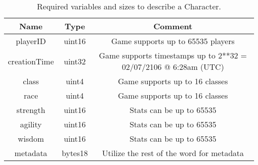 \begin{table}[H]
	\centering
	\vspace*{-1ex}
	\scriptsize
	\vspace{-1ex}
	\caption{Required variables and sizes to describe a Character.}
	\begin{tabular}{|c|c|c|}
        \hline
        \textbf{Name} & \textbf{Type}  & \textbf{Comment}\\ \hline 
        playerID      & uint16         & Game supports up to 65535 players\\
        creationTime  & uint32         & Game supports timestamps up to 2**32 = 02/07/2106 @ 6:28am (UTC) \\
        class         & uint4          & Game supports up to 16 classes \\
        race          & uint4          & Game supports up to 16 classes \\
        strength      & uint16         & Stats can be up to 65535\\
        agility       & uint16         & Stats can be up to 65535 \\
        wisdom        & uint16         & Stats can be up to 65535 \\
        metadata      & bytes18        & Utilize the rest of the word for metadata \\
        \hline
    \end{tabular}
    \label{table:characteristics}
\end{table}